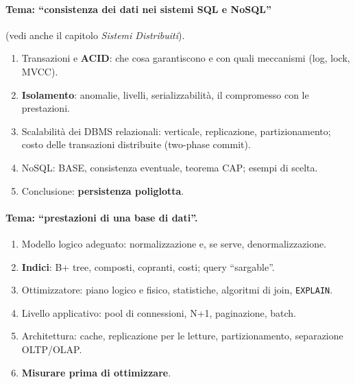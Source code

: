\paragraph{Tema: ``consistenza dei dati nei sistemi SQL e NoSQL''} (vedi anche il capitolo \emph{Sistemi Distribuiti}).
\begin{enumerate}
    \item Transazioni e \textbf{ACID}: che cosa garantiscono e con quali meccanismi (log, lock, MVCC).
    \item \textbf{Isolamento}: anomalie, livelli, serializzabilità, il compromesso con le prestazioni.
    \item Scalabilità dei DBMS relazionali: verticale, replicazione, partizionamento; costo delle transazioni distribuite (two-phase commit).
    \item NoSQL: BASE, consistenza eventuale, teorema CAP; esempi di scelta.
    \item Conclusione: \textbf{persistenza poliglotta}.
\end{enumerate}

\paragraph{Tema: ``prestazioni di una base di dati''.}
\begin{enumerate}
    \item Modello logico adeguato: normalizzazione e, se serve, denormalizzazione.
    \item \textbf{Indici}: B+ tree, composti, copranti, costi; query ``sargable''.
    \item Ottimizzatore: piano logico e fisico, statistiche, algoritmi di join, \texttt{EXPLAIN}.
    \item Livello applicativo: pool di connessioni, N+1, paginazione, batch.
    \item Architettura: cache, replicazione per le letture, partizionamento, separazione OLTP/OLAP.
    \item \textbf{Misurare prima di ottimizzare}.
\end{enumerate}

